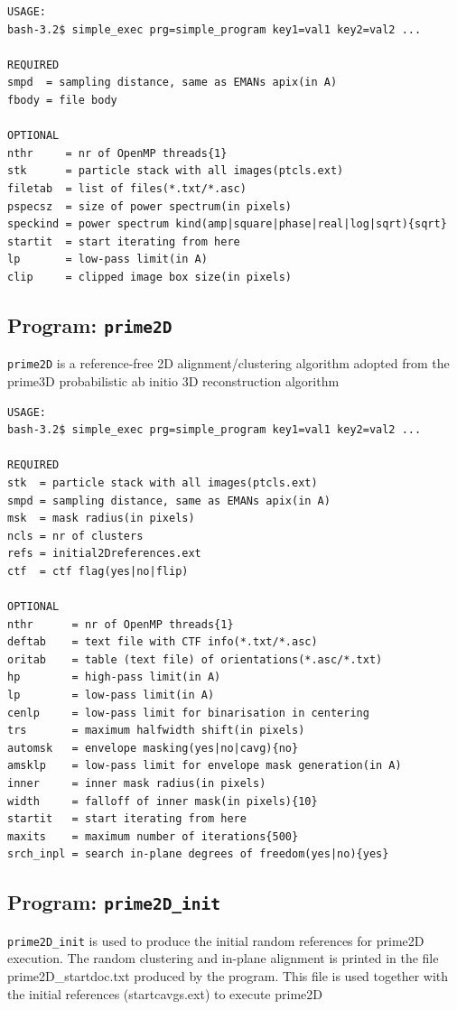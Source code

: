 \documentclass[a4paper,11pt]{article}
\newcommand{\prgname}[1]{\textcolor{NavyBlue}{\texttt{#1}}}
\begin{document}
\begin{verbatim}
USAGE:
bash-3.2$ simple_exec prg=simple_program key1=val1 key2=val2 ...

REQUIRED
smpd  = sampling distance, same as EMANs apix(in A)
fbody = file body

OPTIONAL
nthr     = nr of OpenMP threads{1}
stk      = particle stack with all images(ptcls.ext)
filetab  = list of files(*.txt/*.asc)
pspecsz  = size of power spectrum(in pixels)
speckind = power spectrum kind(amp|square|phase|real|log|sqrt){sqrt}
startit  = start iterating from here
lp       = low-pass limit(in A)
clip     = clipped image box size(in pixels)
\end{verbatim}

\subsection{Program: \prgname{prime2D}}
\label{prime2D}
\prgname{prime2D} is a reference-free 2D alignment/clustering algorithm adopted from the prime3D probabilistic ab initio 3D reconstruction algorithm

\begin{verbatim}
USAGE:
bash-3.2$ simple_exec prg=simple_program key1=val1 key2=val2 ...

REQUIRED
stk  = particle stack with all images(ptcls.ext)
smpd = sampling distance, same as EMANs apix(in A)
msk  = mask radius(in pixels)
ncls = nr of clusters
refs = initial2Dreferences.ext
ctf  = ctf flag(yes|no|flip)

OPTIONAL
nthr      = nr of OpenMP threads{1}
deftab    = text file with CTF info(*.txt/*.asc)
oritab    = table (text file) of orientations(*.asc/*.txt)
hp        = high-pass limit(in A)
lp        = low-pass limit(in A)
cenlp     = low-pass limit for binarisation in centering
trs       = maximum halfwidth shift(in pixels)
automsk   = envelope masking(yes|no|cavg){no}
amsklp    = low-pass limit for envelope mask generation(in A)
inner     = inner mask radius(in pixels)
width     = falloff of inner mask(in pixels){10}
startit   = start iterating from here
maxits    = maximum number of iterations{500}
srch_inpl = search in-plane degrees of freedom(yes|no){yes}
\end{verbatim}

\subsection{Program: \prgname{prime2D\_init}}
\label{prime2D_init}
\prgname{prime2D\_init} is used  to produce the initial random references for prime2D execution. The random clustering and in-plane alignment is printed in the file prime2D\_startdoc.txt produced by the program. This file is used together with the initial references (startcavgs.ext) to execute prime2D
\end{document}
